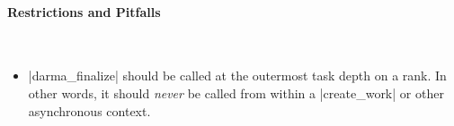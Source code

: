 \paragraph{Restrictions and Pitfalls}\mbox{} \\
\begin{itemize}
  \item |darma\_finalize| should be called at the outermost task depth on
  a rank.  In other words, it should {\it never} be called from within a
  |create\_work| or other asynchronous context.
\end{itemize}




